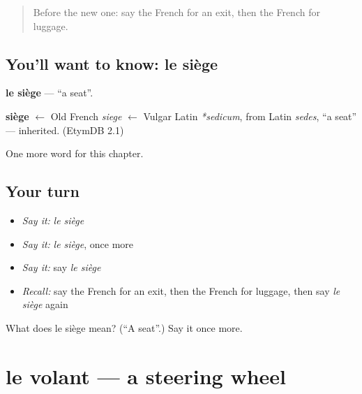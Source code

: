 \label{lesson:FR-C199-siege}



\begin{quote}
Before the new one: say the French for an exit, then the French for luggage.
\end{quote}

\subsection*{You'll want to know: le siège}
\textbf{le siège} — \textquotedblleft{}a seat\textquotedblright{}.

\begin{cousinweb}
\textbf{siège} $\leftarrow$ Old French \emph{siege} $\leftarrow$ Vulgar Latin \emph{*sedicum}, from Latin \emph{sedes}, \textquotedblleft{}a seat\textquotedblright{} — inherited. (EtymDB 2.1)
\end{cousinweb}

\begin{grammarlens}[title={What you've built}]
One more word for this chapter.
\end{grammarlens}

\subsection*{Your turn}
\begin{itemize}
\raggedright
  \item \emph{Say it:} \emph{le siège}
  \item \emph{Say it:} \emph{le siège}, once more
  \item \emph{Say it:} say \emph{le siège}
  \item \emph{Recall:} say the French for an exit, then the French for luggage, then say \emph{le siège} again
\end{itemize}

\begin{tcolorbox}[breakable,colback=teal!4,colframe=teal!35!black,title={Before you move on}]
What does le siège mean? (\textquotedblleft{}A seat\textquotedblright{}.) Say it once more.
\end{tcolorbox}
\section[le volant]{le volant — a steering wheel}

\label{lesson:FR-C199-volant}



